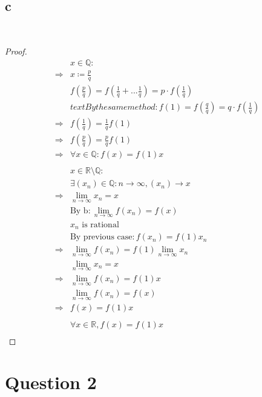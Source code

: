 \documentclass{article}
\begin{document}
~

\subsection*{c}

~

\begin{proof}
    \begin{align*}
        &x\in\mathbb{Q}:\\
        \Rightarrow&x\coloneqq\frac{p}{q}\\
        &f\left(\frac{p}{q}\right)=f\left(\frac{1}{q}+...\frac{1}{q}\right)=p\cdot f\left(\frac{1}{q}\right)\\
        &text{By the same method}:f(1)=f\left(\frac{q}{q}\right)=q\cdot f\left(\frac{1}{q}\right)\\
        \Rightarrow&f\left(\frac{1}{q}\right)=\frac{1}{q}f(1)\\
        \Rightarrow&f\left(\frac{p}{q}\right)=\frac{p}{q} f\left(1\right)\\
        \Rightarrow&\forall x\in \mathbb{Q}:f(x)=f(1)x\\
        &\\
        &x\in \mathbb{R}\setminus\mathbb{Q}:\\
        &\exists (x_n)\in\mathbb{Q}:n\to\infty,(x_n)\to x\\
        \Rightarrow&\lim_{n\to\infty}x_n=x\\
        &\text{By b}:\lim_{n\to\infty}f(x_n)=f(x)\\
        &x_n\text{ is rational}\\
        &\text{By previous case}: f(x_n)=f(1)x_n\\
        \Rightarrow&\lim_{n\to\infty}f(x_n)=f(1)\lim_{n\to\infty}x_n\\
        &\lim_{n\to\infty}x_n=x\\
        \Rightarrow&\lim_{n\to\infty}f(x_n)=f(1)x\\
        &\lim_{n\to\infty}f(x_n)=f(x)\\
        \Rightarrow&f(x)=f(1)x\\
        &\\
        &\forall x\in\mathbb{R},f(x)=f(1)x\\
    \end{align*}
\end{proof}

\newpage

\section*{Question 2}
\end{document}
